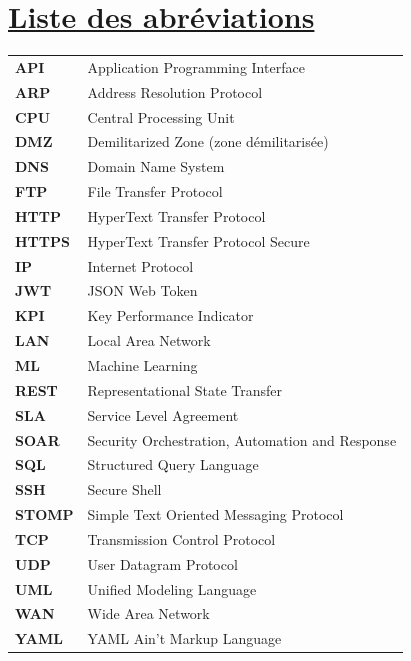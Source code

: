 \documentclass[12pt,a4paper]{report}
\newcommand{\ub}[1]{\uline{\textbf{#1}}}
\begin{document}
\section*{\ub{Liste des abréviations}}
\begin{center}
\begingroup\small\renewcommand{\arraystretch}{1.25}\setlength{\tabcolsep}{10pt}
\begin{tabular}{@{}p{3.0cm}p{10.5cm}@{}}
\textbf{API} & Application Programming Interface\\
\textbf{ARP} & Address Resolution Protocol\\
\textbf{CPU} & Central Processing Unit\\
\textbf{DMZ} & Demilitarized Zone (zone démilitarisée)\\
\textbf{DNS} & Domain Name System\\
\textbf{FTP} & File Transfer Protocol\\
\textbf{HTTP} & HyperText Transfer Protocol\\
\textbf{HTTPS} & HyperText Transfer Protocol Secure\\
\textbf{IP} & Internet Protocol\\
\textbf{JWT} & JSON Web Token\\
\textbf{KPI} & Key Performance Indicator\\
\textbf{LAN} & Local Area Network\\
\textbf{ML} & Machine Learning\\
\textbf{REST} & Representational State Transfer\\
\textbf{SLA} & Service Level Agreement\\
\textbf{SOAR} & Security Orchestration, Automation and Response\\
\textbf{SQL} & Structured Query Language\\
\textbf{SSH} & Secure Shell\\
\textbf{STOMP} & Simple Text Oriented Messaging Protocol\\
\textbf{TCP} & Transmission Control Protocol\\
\textbf{UDP} & User Datagram Protocol\\
\textbf{UML} & Unified Modeling Language\\
\textbf{WAN} & Wide Area Network\\
\textbf{YAML} & YAML Ain't Markup Language\\
\end{tabular}
\endgroup
\end{center}
\clearpage
{}
\end{document}

